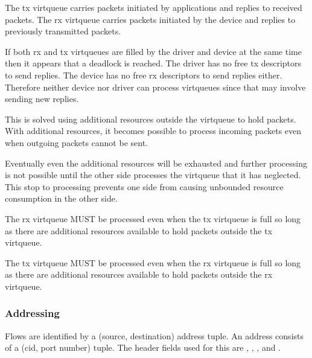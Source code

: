 The tx virtqueue carries packets initiated by applications and replies to
received packets.  The rx virtqueue carries packets initiated by the device and
replies to previously transmitted packets.

If both rx and tx virtqueues are filled by the driver and device at the same
time then it appears that a deadlock is reached.  The driver has no free tx
descriptors to send replies.  The device has no free rx descriptors to send
replies either.  Therefore neither device nor driver can process virtqueues
since that may involve sending new replies.

This is solved using additional resources outside the virtqueue to hold
packets.  With additional resources, it becomes possible to process incoming
packets even when outgoing packets cannot be sent.

Eventually even the additional resources will be exhausted and further
processing is not possible until the other side processes the virtqueue that
it has neglected.  This stop to processing prevents one side from causing
unbounded resource consumption in the other side.


The rx virtqueue MUST be processed even when the tx virtqueue is full so long as there are additional resources available to hold packets outside the tx virtqueue.


The tx virtqueue MUST be processed even when the rx virtqueue is full so long as there are additional resources available to hold packets outside the rx virtqueue.

\subsubsection{Addressing}\label{sec:Device Types / Socket Device / Device Operation / Addressing}

Flows are identified by a (source, destination) address tuple.  An address
consists of a (cid, port number) tuple. The header fields used for this are
, , , and .

